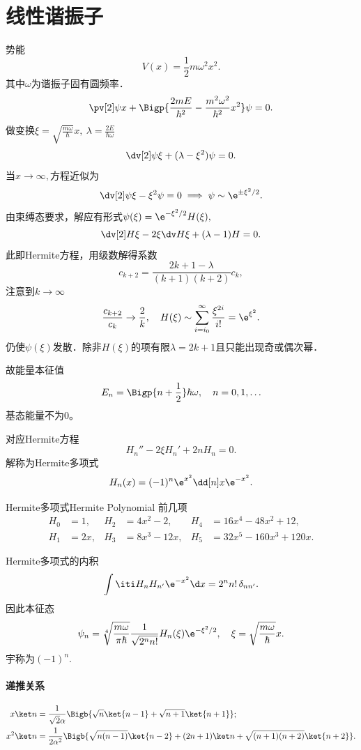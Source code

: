 \section{线性谐振子}
势能
\[
	V(x)=\frac12m\omega^2x^2.
\]
其中$\omega$为谐振子固有圆频率．
\[
	\pv[2]\psi{x}+\Bigp{\frac{2mE}{\hbar^2}-\frac{m^2\omega^2}{\hbar^2}x^2}\psi=0.
\]
做变换$\xi=\sqrt{\frac{m\omega}\hbar}x,~\lambda=\frac{2E}{\hbar\omega}$
\[
	\dv[2]\psi\xi+(\lambda-\xi^2)\psi=0.
\]
当$x\to\infty,$方程近似为
\[
	\dv[2]\psi\xi-\xi^2\psi=0\implies\psi\sim\e^{\pm\xi^2/2}.
\]
由束缚态要求，解应有形式$\psi(\xi)=\e^{-\xi^2/2}H(\xi),$
\[
	\dv[2] H\xi-2\xi\dv H\xi+(\lambda-1)H=0.
\]
此即Hermite方程，用级数解得系数
\[
	c_{k+2}=\frac{2k+1-\lambda}{(k+1)(k+2)}c_k,
\]
注意到$k\to\infty$
\[
	\frac{c_{k+2}}{c_k}\to\frac{2}k,\quad H(\xi)\sim\sum_{i=i_0}^\infty\frac{\xi^{2i}}{i!}=\e^{\xi^2}.
\]
仍使$\psi(\xi)$发散．除非$H(\xi)$的项有限$\lambda=2k+1$且只能出现奇或偶次幂．

故能量本征值
\begin{align}
	E_n=\Bigp{n+\frac12}\hbar\omega,\quad n=0,1,\ldots
\end{align}
基态能量不为0。

对应Hermite方程
\[
	H_n''-2\xi H_n'+2nH_n=0.
\]
解称为Hermite多项式
\[
	H_n(x)=(-1)^n\e^{x^2}\dd[n]x\e^{-x^2}.
\]
\begin{example}{Hermite多项式}{Hermite Polynomial}
	前几项 %
	\begin{align*}
		H_0 & =1,  & H_2 & =4x^2-2,   & H_4 & =16x^4-48x^2+12,    \\
		H_1 & =2x, & H_3 & =8x^3-12x, & H_5 & =32x^5-160x^3+120x.
	\end{align*}

\end{example}
Hermite多项式的内积
\[
	\int\iti H_nH_{n'}\e^{-x^2}\d x=2^nn!\,\delta_{nn'}.
\]
因此本征态
\begin{align}
	\psi_n=\sqrt[4]{\frac{m\omega}{\pi\hbar}}\frac1{\sqrt{2^nn!}}H_n(\xi)\e^{-\xi^2/2},\quad\xi=\sqrt{\frac{m\omega}\hbar}x.
\end{align}
宇称为$(-1)^n.$
\paragraph{递推关系}
\begin{align}
	x\ket n&=\frac1{\sqrt2\alpha}\Bigb{\sqrt n\ket{n-1}+\sqrt{n+1}\ket{n+1}};\\
	x^2\ket n&%
	=\frac1{2\alpha^2}\Bigb{\sqrt{n(n-1)}\ket{n-2}+(2n+1)\ket n+\sqrt{(n+1)(n+2)}\ket{n+2}}.
\end{align}
